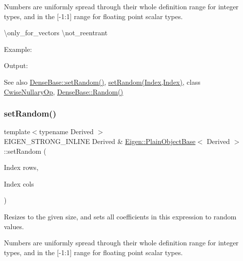 Numbers are uniformly spread through their whole definition range for integer types, and in the \mbox{[}-\/1\+:1\mbox{]} range for floating point scalar types.

\textbackslash{}only\+\_\+for\+\_\+vectors \textbackslash{}not\+\_\+reentrant

Example\+: 
\begin{DoxyCodeInclude}{0}
\end{DoxyCodeInclude}
 Output\+: 
\begin{DoxyVerbInclude}
\end{DoxyVerbInclude}


\begin{DoxySeeAlso}{See also}
\mbox{\hyperlink{class_eigen_1_1_dense_base_ac476e5852129ba32beaa1a8a3d7ee0db}{Dense\+Base\+::set\+Random()}}, \mbox{\hyperlink{class_eigen_1_1_plain_object_base_a2139f7c1a6711ebd86c4ff6378f5e775}{set\+Random(\+Index,\+Index)}}, class \mbox{\hyperlink{class_eigen_1_1_cwise_nullary_op}{Cwise\+Nullary\+Op}}, \mbox{\hyperlink{class_eigen_1_1_dense_base_ae814abb451b48ed872819192dc188c19}{Dense\+Base\+::\+Random()}} 
\end{DoxySeeAlso}
\mbox{\label{class_eigen_1_1_plain_object_base_a2139f7c1a6711ebd86c4ff6378f5e775}} 
\subsubsection{\texorpdfstring{setRandom()}{setRandom()}\hspace{0.1cm}{\footnotesize\ttfamily [2/2]}}
{\footnotesize\ttfamily template$<$typename Derived $>$ \\
E\+I\+G\+E\+N\+\_\+\+S\+T\+R\+O\+N\+G\+\_\+\+I\+N\+L\+I\+NE Derived \& \mbox{\hyperlink{class_eigen_1_1_plain_object_base}{Eigen\+::\+Plain\+Object\+Base}}$<$ Derived $>$\+::set\+Random (\begin{DoxyParamCaption}\item[{Index}]{rows,  }\item[{Index}]{cols }\end{DoxyParamCaption})}

Resizes to the given size, and sets all coefficients in this expression to random values.

Numbers are uniformly spread through their whole definition range for integer types, and in the \mbox{[}-\/1\+:1\mbox{]} range for floating point scalar types.

